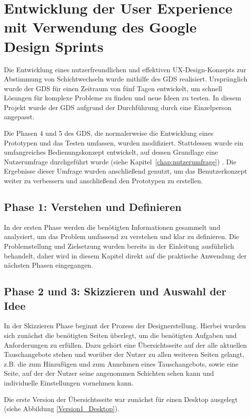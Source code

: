 \chapter{Entwicklung der User Experience mit Verwendung des Google Design Sprints}

Die Entwicklung eines nutzerfreundlichen und effektiven UX-Design-Konzepts zur Abstimmung von Schichtwechseln wurde mithilfe des GDS realisiert. Ursprünglich wurde der GDS für einen Zeitraum von fünf Tagen entwickelt, um schnell Lösungen für komplexe Probleme zu finden und neue Ideen zu testen. In diesem Projekt wurde der GDS aufgrund der Durchführung durch eine Einzelperson angepasst.

Die Phasen 4 und 5 des GDS, die normalerweise die Entwicklung eines Prototypen und das Testen umfassen, wurden modifiziert. Stattdessen wurde ein umfangreiches Bedienungskonzept entwickelt, auf dessen Grundlage eine Nutzerumfrage durchgeführt wurde (siehe Kapitel~\ref{chap:nutzerumfrage}) .
Die Ergebnisse dieser Umfrage wurden anschließend genutzt, um das Benutzerkonzept weiter zu verbessern und anschließend den Prototypen zu erstellen.

\section{Phase 1: Verstehen und Definieren}
In der ersten Phase werden die benötigten Informationen gesammelt und analysiert, um das Problem umfassend zu verstehen und klar zu definieren. Die Problemstellung und Zielsetzung wurden bereits in der Einleitung ausführlich behandelt, daher wird in diesem Kapitel direkt auf die praktische Anwendung der nächsten Phasen eingegangen.

\section{Phase 2 und 3: Skizzieren und Auswahl der Idee}
In der Skizzieren Phase beginnt der Prozess der Designerstellung. Hierbei wurden sich zunächst die benötigten Seiten überlegt, um die benötigten Aufgaben und Anforderungen zu erfüllen. Dazu gehört eine Übersichtsseite auf der alle aktuellen Tauschangebote stehen und worüber der Nutzer zu allen weiteren Seiten gelangt, z.B. die zum Hinzufügen und zum Annehmen eines Tauschangebots, sowie eine Seite, auf der der Nutzer seine angenommen Schichten sehen kann und individuelle Einstellungen vornehmen kann. 

Die erste Version der Übersichtsseite war zunächst für einen Desktop ausgelegt (siehe Abbildung \ref{Version1_Desktop}). 

